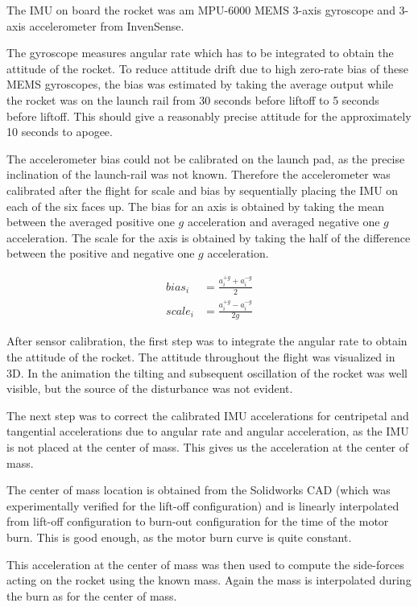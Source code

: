 The IMU on board the rocket was am MPU-6000 MEMS 3-axis gyroscope and 3-axis accelerometer from InvenSense.

The gyroscope measures angular rate which has to be integrated to obtain the attitude of the rocket.
To reduce attitude drift due to high zero-rate bias of these MEMS gyroscopes, the bias was estimated by taking the average output while the rocket was on the launch rail from 30 seconds before liftoff to 5 seconds before liftoff.
This should give a reasonably precise attitude for the approximately 10 seconds to apogee.

The accelerometer bias could not be calibrated on the launch pad, as the precise inclination of the launch-rail was not known.
Therefore the accelerometer was calibrated after the flight for scale and bias by sequentially placing the IMU on each of the six faces up.
The bias for an axis is obtained by taking the mean between the averaged positive one $g$ acceleration and averaged negative one $g$ acceleration.
The scale for the axis is obtained by taking the half of the difference between the positive and negative one $g$ acceleration.

\begin{align}
    bias_i &= \frac{a^{+g}_i + a^{-g}_i}{2} \\
    scale_i &= \frac{a^{+g}_i - a^{-g}_i}{2g}
\end{align}


After sensor calibration, the first step was to integrate the angular rate to obtain the attitude of the rocket.
The attitude throughout the flight was visualized in 3D.
In the animation the tilting and subsequent oscillation of the rocket was well visible, but the source of the disturbance was not evident.


The next step was to correct the calibrated IMU accelerations for centripetal and tangential accelerations due to angular rate and angular acceleration, as the IMU is not placed at the center of mass. This gives us the acceleration at the center of mass.

The center of mass location is obtained from the Solidworks CAD (which was experimentally verified for the lift-off configuration) and is linearly interpolated from lift-off configuration to burn-out configuration for the time of the motor burn. This is good enough, as the motor burn curve is quite constant.

This acceleration at the center of mass was then used to compute the side-forces acting on the rocket using the known mass. Again the mass is interpolated during the burn as for the center of mass.


